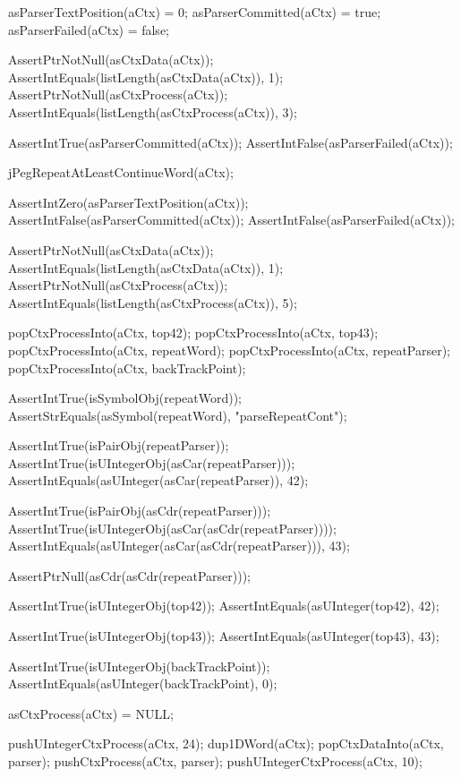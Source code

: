   asParserTextPosition(aCtx) = 0;
  asParserCommitted(aCtx)    = true;
  asParserFailed(aCtx)       = false;
  
  AssertPtrNotNull(asCtxData(aCtx));
  AssertIntEquals(listLength(asCtxData(aCtx)), 1);
  AssertPtrNotNull(asCtxProcess(aCtx));
  AssertIntEquals(listLength(asCtxProcess(aCtx)), 3);
  
  AssertIntTrue(asParserCommitted(aCtx));
  AssertIntFalse(asParserFailed(aCtx));
  
  jPegRepeatAtLeastContinueWord(aCtx);
  
  AssertIntZero(asParserTextPosition(aCtx));
  AssertIntFalse(asParserCommitted(aCtx));
  AssertIntFalse(asParserFailed(aCtx));
  
  AssertPtrNotNull(asCtxData(aCtx));
  AssertIntEquals(listLength(asCtxData(aCtx)), 1);
  AssertPtrNotNull(asCtxProcess(aCtx));
  AssertIntEquals(listLength(asCtxProcess(aCtx)), 5);
    
  popCtxProcessInto(aCtx, top42);
  popCtxProcessInto(aCtx, top43);
  popCtxProcessInto(aCtx, repeatWord);
  popCtxProcessInto(aCtx, repeatParser);
  popCtxProcessInto(aCtx, backTrackPoint);
  
  AssertIntTrue(isSymbolObj(repeatWord));
  AssertStrEquals(asSymbol(repeatWord), "parseRepeatCont");
  
  AssertIntTrue(isPairObj(repeatParser));
  AssertIntTrue(isUIntegerObj(asCar(repeatParser)));
  AssertIntEquals(asUInteger(asCar(repeatParser)), 42);
  
  AssertIntTrue(isPairObj(asCdr(repeatParser)));
  AssertIntTrue(isUIntegerObj(asCar(asCdr(repeatParser))));
  AssertIntEquals(asUInteger(asCar(asCdr(repeatParser))), 43);
  
  AssertPtrNull(asCdr(asCdr(repeatParser)));
  
  AssertIntTrue(isUIntegerObj(top42));
  AssertIntEquals(asUInteger(top42), 42);  

  AssertIntTrue(isUIntegerObj(top43));
  AssertIntEquals(asUInteger(top43), 43);
  
  AssertIntTrue(isUIntegerObj(backTrackPoint));
  AssertIntEquals(asUInteger(backTrackPoint), 0);
\stopCTest
\stopTestCase

\startCTest
  asCtxProcess(aCtx) = NULL;
  
  pushUIntegerCtxProcess(aCtx, 24);
  dup1DWord(aCtx);
  popCtxDataInto(aCtx, parser);
  pushCtxProcess(aCtx, parser);
  pushUIntegerCtxProcess(aCtx, 10);
  
